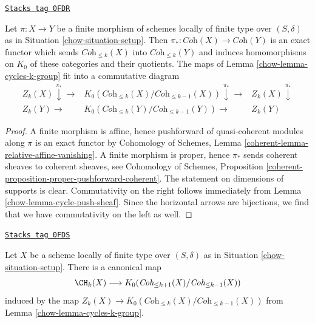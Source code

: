 \begin{lemma}
\label{chow-lemma-finite-cycles-k-group}
\href{https://stacks.math.columbia.edu/tag/0FDR}{\texttt{Stacks tag 0FDR}}

Let $\pi : X \to Y$ be a finite morphism of schemes locally of finite type
over $(S, \delta)$ as in Situation \ref{chow-situation-setup}. Then
$\pi_* : \textit{Coh}(X) \to \textit{Coh}(Y)$ is an exact functor
which sends $\textit{Coh}_{\leq k}(X)$ into $\textit{Coh}_{\leq k}(Y)$
and induces homomorphisms on $K_0$ of these categories and
their quotients. The maps of Lemma \ref{chow-lemma-cycles-k-group}
fit into a commutative diagram
$$
\begin{array}{ccc}Z_k(X) \overset{\pi_*}{\downarrow}\longrightarrow & K_0(\textit{Coh}_{\leq k}(X)/\textit{Coh}_{\leq k - 1}(X))
\overset{\pi_*}{\downarrow}\longrightarrow & Z_k(X) \overset{\pi_*}{\downarrow} \\ Z_k(Y) \longrightarrow & K_0(\textit{Coh}_{\leq k}(Y)/\textit{Coh}_{\leq k - 1}(Y)) \longrightarrow & Z_k(Y)\end{array}
$$
\end{lemma}

\begin{proof}

A finite morphism is affine, hence pushforward of quasi-coherent
modules along $\pi$ is an exact functor by
Cohomology of Schemes, Lemma \ref{coherent-lemma-relative-affine-vanishing}.
A finite morphism is proper, hence $\pi_*$ sends coherent sheaves
to coherent sheaves, see Cohomology of Schemes, Proposition
\ref{coherent-proposition-proper-pushforward-coherent}.
The statement on dimensions of supports is clear.
Commutativity on the right follows immediately from
Lemma \ref{chow-lemma-cycle-push-sheaf}.
Since the horizontal arrows are bijections, we find that
we have commutativity on the left as well.
\end{proof}

\begin{lemma}
\label{chow-lemma-from-chow-to-K}
\href{https://stacks.math.columbia.edu/tag/0FDS}{\texttt{Stacks tag 0FDS}}

Let $X$ be a scheme locally of finite type over $(S, \delta)$
as in Situation \ref{chow-situation-setup}. There is a canonical map
$$
\CH_k(X)
\longrightarrow
K_0(\textit{Coh}_{\leq k + 1}(X)/\textit{Coh}_{\leq k - 1}(X))
$$
induced by the map
$Z_k(X) \to K_0(\textit{Coh}_{\leq k}(X)/\textit{Coh}_{\leq k - 1}(X))$
from Lemma \ref{chow-lemma-cycles-k-group}.
\end{lemma}

